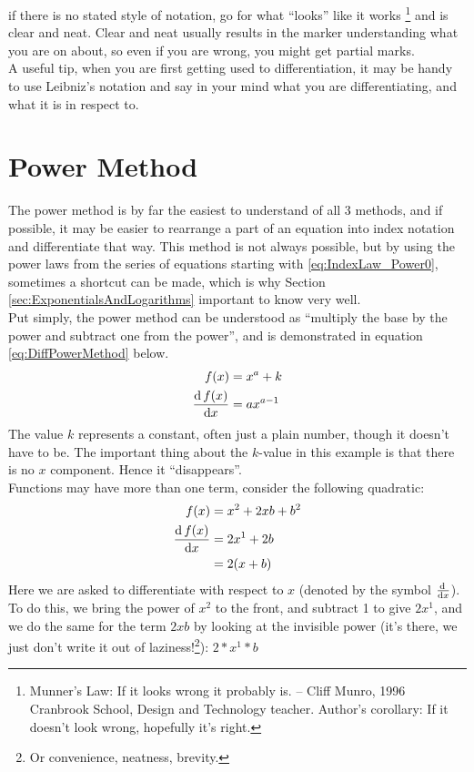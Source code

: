 if there is no stated style of notation, go for what ``looks'' like it works
\footnote{Munner's Law: If it looks wrong it probably is. -- Cliff Munro,
1996 Cranbrook School, Design and Technology teacher. Author's corollary: If it
doesn't look wrong, hopefully it's right.} and is clear and neat. Clear and
neat usually results in the marker understanding what you are on about, so even
if you are wrong, you might get partial marks.
\\
A useful tip, when you are first getting used to differentiation, it may be
handy to use Leibniz's notation and say in your mind what you are
differentiating, and what it is in respect to.
\section{Power Method}
\label{sec:PowerMethod}
The power method is by far the easiest to understand of all 3 methods, and if
possible, it may be easier to rearrange a part of an equation into index
notation and differentiate that way. This method is not always possible,
but by using the power laws from the series of equations starting with
\ref{eq:IndexLaw_Power0}, sometimes a shortcut can be made, which is why
Section \ref{sec:ExponentialsAndLogarithms} important to know very well.
\\
Put simply, the power method can be understood as ``multiply the base by the
power and subtract one from the power'', and is demonstrated in equation
\ref{eq:DiffPowerMethod} below.
\begin{align}
             f(x) & = {x}^{a} + k \label{eq:DiffPowerMethodKValue} \\
  \frac{\mathrm{d}\,f(x)}{\mathrm{d}x} & = a{x}^{a-1} \label{eq:DiffPowerMethod}
\end{align}
The value $k$ represents a constant, often just a plain number, though it
doesn't have to be. The important thing about the $k$-value in this example is
that there is no $x$ component. Hence it ``disappears''.\\
Functions may have more than one term, consider the following quadratic:
\begin{align}
  f(x)             & = {x}^{2} + 2xb + {b}^{2} \\
  \frac{\mathrm{d}\,f(x)}{\mathrm{d}x} & = 2{x}^{1} + 2b \\
                   & = 2(x+b) \label{eq:DiffPowerMethodRespectTo}
\end{align}
Here we are asked to differentiate with respect to $x$ (denoted by the symbol
$\frac{\mathrm{d}\,}{\mathrm{d}x}$). To do this, we bring the power of ${x}^{2}$ to the front, and
subtract 1 to give $2{x}^{1}$, and we do the same for the term ${2xb}$ by
looking at the invisible power (it's there, we just don't write it out of
laziness!\footnote{Or convenience, neatness, brevity.}): $2*{x}^{1}*b$
